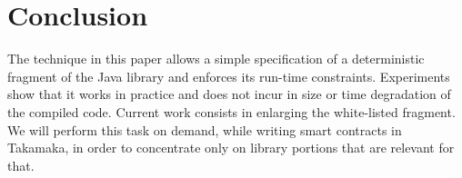 \section{Conclusion}\label{sec:conclusion}

The technique in this paper allows a simple
specification of a deterministic fragment of the Java library and
enforces its run-time constraints.
Experiments show that it works in practice and does not incur
in size or time degradation of the compiled code.
Current work consists in enlarging the white-listed fragment.
We will perform this task on demand, while writing smart contracts
in Takamaka, in order to concentrate only on library portions
that are relevant for that.

